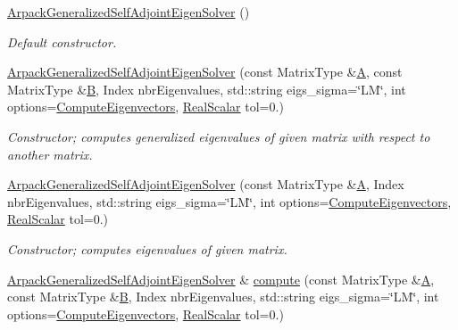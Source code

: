 \begin{DoxyCompactItemize}
\hyperlink{class_eigen_1_1_arpack_generalized_self_adjoint_eigen_solver_aab45c05af4937baddb38e26bffe80a42}{Arpack\+Generalized\+Self\+Adjoint\+Eigen\+Solver} ()
\begin{DoxyCompactList}\small\item\em Default constructor. \end{DoxyCompactList}\item 
\hyperlink{class_eigen_1_1_arpack_generalized_self_adjoint_eigen_solver_ab67d6c5218fd84e74fc03d55acd0c89e}{Arpack\+Generalized\+Self\+Adjoint\+Eigen\+Solver} (const Matrix\+Type \&\hyperlink{group___core___module_class_eigen_1_1_matrix}{A}, const Matrix\+Type \&\hyperlink{group___core___module_class_eigen_1_1_matrix}{B}, Index nbr\+Eigenvalues, std\+::string eigs\+\_\+sigma=\char`\"{}LM\char`\"{}, int options=\hyperlink{group__enums_ggae3e239fb70022eb8747994cf5d68b4a9ada93d8885bde32b876ba4af01d3292cc}{Compute\+Eigenvectors}, \hyperlink{class_eigen_1_1_arpack_generalized_self_adjoint_eigen_solver_a2555af55e53bf9de894a49e639be2e1e}{Real\+Scalar} tol=0.)
\begin{DoxyCompactList}\small\item\em Constructor; computes generalized eigenvalues of given matrix with respect to another matrix. \end{DoxyCompactList}\item 
\hyperlink{class_eigen_1_1_arpack_generalized_self_adjoint_eigen_solver_a896d444b17b59c3b061800f579317a73}{Arpack\+Generalized\+Self\+Adjoint\+Eigen\+Solver} (const Matrix\+Type \&\hyperlink{group___core___module_class_eigen_1_1_matrix}{A}, Index nbr\+Eigenvalues, std\+::string eigs\+\_\+sigma=\char`\"{}LM\char`\"{}, int options=\hyperlink{group__enums_ggae3e239fb70022eb8747994cf5d68b4a9ada93d8885bde32b876ba4af01d3292cc}{Compute\+Eigenvectors}, \hyperlink{class_eigen_1_1_arpack_generalized_self_adjoint_eigen_solver_a2555af55e53bf9de894a49e639be2e1e}{Real\+Scalar} tol=0.)
\begin{DoxyCompactList}\small\item\em Constructor; computes eigenvalues of given matrix. \end{DoxyCompactList}\item 
\hyperlink{class_eigen_1_1_arpack_generalized_self_adjoint_eigen_solver}{Arpack\+Generalized\+Self\+Adjoint\+Eigen\+Solver} \& \hyperlink{class_eigen_1_1_arpack_generalized_self_adjoint_eigen_solver_af9be5d7818b4b0a7b1a7f5b2156f5814}{compute} (const Matrix\+Type \&\hyperlink{group___core___module_class_eigen_1_1_matrix}{A}, const Matrix\+Type \&\hyperlink{group___core___module_class_eigen_1_1_matrix}{B}, Index nbr\+Eigenvalues, std\+::string eigs\+\_\+sigma=\char`\"{}LM\char`\"{}, int options=\hyperlink{group__enums_ggae3e239fb70022eb8747994cf5d68b4a9ada93d8885bde32b876ba4af01d3292cc}{Compute\+Eigenvectors}, \hyperlink{class_eigen_1_1_arpack_generalized_self_adjoint_eigen_solver_a2555af55e53bf9de894a49e639be2e1e}{Real\+Scalar} tol=0.)

\end{DoxyCompactItemize}
